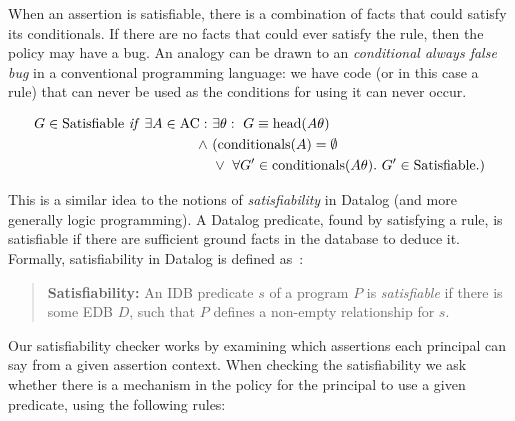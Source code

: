 \documentclass[thesis.tex]{subfiles}
\begin{document}
When an assertion is satisfiable, there is a combination of facts that
could satisfy its conditionals. If there are no facts that could ever
satisfy the rule, then the policy may have a bug. An analogy can be
drawn to an \emph{conditional always false bug} in a conventional
programming language: we have code (or in this case a rule) that can
never be used as the conditions for using it can never occur.

\begin{align*}
  G \in \text{Satisfiable}~\text{\textit{if}}~\exists A \in \text{AC}:~&\exists \theta:~G\equiv\text{head}(A\theta) \\
                                                              \wedge~ & (\text{conditionals}(A) = \emptyset \\
                                                                      & \vee~\forall G^\prime \in \text{conditionals}(A\theta).~G^\prime \in \text{Satisfiable}.)
\end{align*}

This is a similar idea to the notions of \emph{satisfiability} in Datalog (and
more generally logic programming). A Datalog predicate, found by satisfying a
rule, is satisfiable if there are sufficient ground facts in the database to
deduce it. Formally, satisfiability in Datalog is defined
as~\cite{alon_levy_equivalence_1993}:

\begin{quote}
  \textbf{Satisfiability:} An IDB predicate $s$ of a program $P$ is
  \emph{satisfiable} if there is some EDB $D$, such that $P$ defines a
  non-empty relationship for $s$.
\end{quote}

Our satisfiability checker works by examining which assertions each principal can say from a given assertion context.
When checking the satisfiability we ask whether there is a mechanism in the policy for the principal to use a given predicate, using the following rules:
\end{document}
